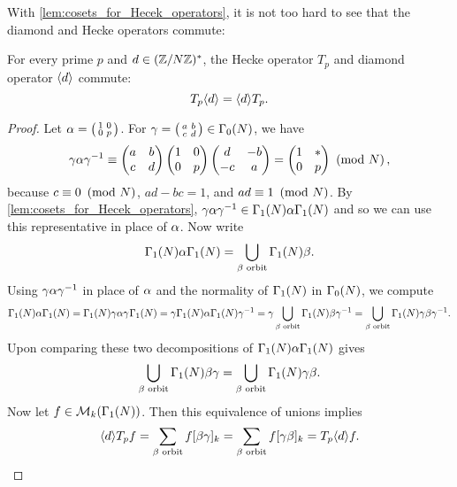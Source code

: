       With \cref{lem:cosets_for_Hecek_operators}, it is not too hard to see that the diamond and Hecke operators commute:

      \begin{proposition}\label{prop:diamond_Hecke_operators_commute_modular}
        For every prime $p$ and $d \in (\mathbb{Z}/N\mathbb{Z})^{\ast}$, the Hecke operator $T_{p}$ and diamond operator $\langle d\rangle$ commute:
        \[
          T_{p}\langle d\rangle = \langle d\rangle T_{p}.
        \]
      \end{proposition}
      \begin{proof}
        Let $\alpha = \begin{psmallmatrix} 1 & 0 \\ 0 & p \end{psmallmatrix}$. For $\gamma = \begin{psmallmatrix} a & b \\ c & d \end{psmallmatrix} \in \Gamma_{0}(N)$, we have
        \[
          \gamma\alpha\gamma^{-1} \equiv \begin{pmatrix} a & b \\ c & d \end{pmatrix}\begin{pmatrix} 1 & 0 \\ 0 & p \end{pmatrix}\begin{pmatrix} d & -b \\ -c & a \end{pmatrix} = \begin{pmatrix} 1 & \ast \\ 0 & p \end{pmatrix} \ \left(\text{mod }N\right),
        \]
        because $c \equiv 0 \ \left(\text{mod }N\right)$, $ad-bc = 1$, and $ad \equiv {1} \ \left(\text{mod }N\right)$. By \cref{lem:cosets_for_Hecek_operators}, $\gamma\alpha\gamma^{-1} \in \Gamma_{1}(N)\alpha\Gamma_{1}(N)$ and so we can use this representative in place of $\alpha$. Now write
        \[
          \Gamma_{1}(N)\alpha\Gamma_{1}(N) = \bigcup_{\beta \text{ orbit}}\Gamma_{1}(N)\beta.
        \]
        Using $\gamma\alpha\gamma^{-1}$ in place of $\alpha$ and the normality of $\Gamma_{1}(N)$ in $\Gamma_{0}(N)$, we compute
        \[
          \Gamma_{1}(N)\alpha\Gamma_{1}(N) = \Gamma_{1}(N)\gamma\alpha\gamma^{}\Gamma_{1}(N) = \gamma\Gamma_{1}(N)\alpha\Gamma_{1}(N)\gamma^{-1} = \gamma\bigcup_{\beta \text{ orbit}}\Gamma_{1}(N)\beta\gamma^{-1} = \bigcup_{\beta \text{ orbit}}\Gamma_{1}(N)\gamma\beta\gamma^{-1}.
        \]
        Upon comparing these two decompositions of $\Gamma_{1}(N)\alpha\Gamma_{1}(N)$ gives
        \[
          \bigcup_{\beta \text{ orbit}}\Gamma_{1}(N)\beta\gamma = \bigcup_{\beta \text{ orbit}}\Gamma_{1}(N)\gamma\beta.
        \]
        Now let $f \in \mathcal{M}_{k}(\Gamma_{1}(N))$. Then this equivalence of unions implies
        \[
        \langle d\rangle T_{p}f = \sum_{\beta \text{ orbit}}f[\beta\gamma]_{k} = \sum_{\beta \text{ orbit}}f[\gamma\beta]_{k} = T_{p}\langle d\rangle f.
        \]
      \end{proof}
      
